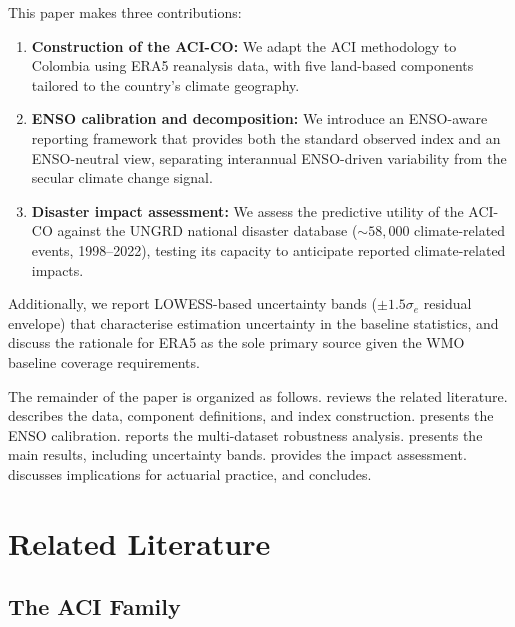 \documentclass[12pt]{article}
\begin{document}
This paper makes three contributions:
 
\begin{enumerate}
\item \textbf{Construction of the ACI-CO:} We adapt the ACI methodology to Colombia using ERA5 reanalysis data, with five land-based components tailored to the country's climate geography.
 
\item \textbf{ENSO calibration and decomposition:} We introduce an ENSO-aware reporting framework that provides both the standard observed index and an ENSO-neutral view, separating interannual ENSO-driven variability from the secular climate change signal.
 
\item \textbf{Disaster impact assessment:} We assess the predictive utility of the ACI-CO against the UNGRD national disaster database (${\sim}58{,}000$ climate-related events, 1998--2022), testing its capacity to anticipate reported climate-related impacts.
\end{enumerate}
 
Additionally, we report LOWESS-based uncertainty bands ($\pm 1.5\sigma_e$ residual envelope) that characterise estimation uncertainty in the baseline statistics, and discuss the rationale for ERA5 as the sole primary source given the WMO baseline coverage requirements.
 
The remainder of the paper is organized as follows.  reviews the related literature.  describes the data, component definitions, and index construction.  presents the ENSO calibration.  reports the multi-dataset robustness analysis.  presents the main results, including uncertainty bands.  provides the impact assessment.  discusses implications for actuarial practice, and  concludes.
 
\section{Related Literature}\label{sec:literature}
 
\subsection{The ACI Family}
 
\end{document}
